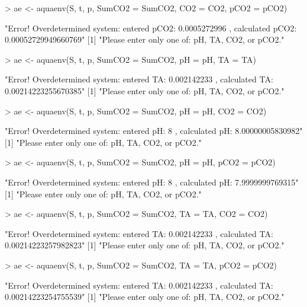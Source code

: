 \documentclass[article,nojss]{jss}
\begin{document}
\begin{scriptsize}
\begin{Schunk}
\begin{Sinput}
> ae <- aquaenv(S, t, p, SumCO2 = SumCO2, CO2 = CO2, pCO2 = pCO2)
\end{Sinput}
\begin{Soutput}
[1] "Error! Overdetermined system: entered pCO2: 0.0005272996 , calculated pCO2: 0.00052729949660769"
[1] "Please enter only one of: pH, TA, CO2, or pCO2."
\end{Soutput}
\begin{Sinput}
> ae <- aquaenv(S, t, p, SumCO2 = SumCO2, pH = pH, TA = TA)
\end{Sinput}
\begin{Soutput}
[1] "Error! Overdetermined system: entered TA: 0.002142233 , calculated TA: 0.00214223255670385"
[1] "Please enter only one of: pH, TA, CO2, or pCO2."
\end{Soutput}
\begin{Sinput}
> ae <- aquaenv(S, t, p, SumCO2 = SumCO2, pH = pH, CO2 = CO2)
\end{Sinput}
\begin{Soutput}
[1] "Error! Overdetermined system: entered pH: 8 , calculated pH: 8.00000005830982"
[1] "Please enter only one of: pH, TA, CO2, or pCO2."
\end{Soutput}
\begin{Sinput}
> ae <- aquaenv(S, t, p, SumCO2 = SumCO2, pH = pH, pCO2 = pCO2)
\end{Sinput}
\begin{Soutput}
[1] "Error! Overdetermined system: entered pH: 8 , calculated pH: 7.9999999769315"
[1] "Please enter only one of: pH, TA, CO2, or pCO2."
\end{Soutput}
\begin{Sinput}
> ae <- aquaenv(S, t, p, SumCO2 = SumCO2, TA = TA, CO2 = CO2)
\end{Sinput}
\begin{Soutput}
[1] "Error! Overdetermined system: entered TA: 0.002142233 , calculated TA: 0.00214223257982823"
[1] "Please enter only one of: pH, TA, CO2, or pCO2."
\end{Soutput}
\begin{Sinput}
> ae <- aquaenv(S, t, p, SumCO2 = SumCO2, TA = TA, pCO2 = pCO2)
\end{Sinput}
\begin{Soutput}
[1] "Error! Overdetermined system: entered TA: 0.002142233 , calculated TA: 0.00214223254755539"
[1] "Please enter only one of: pH, TA, CO2, or pCO2."
\end{Soutput}
\end{Schunk}
\end{scriptsize}
\end{document}
